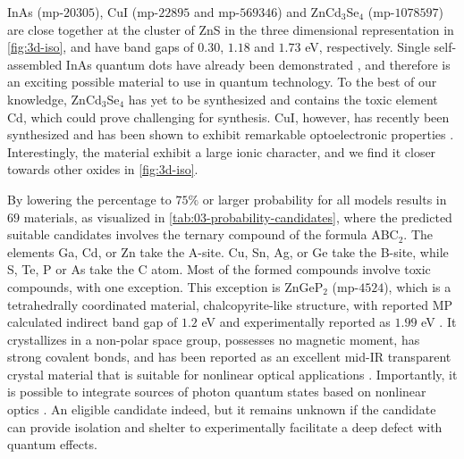 
InAs (mp-$20305$), CuI (mp-$22895$ and mp-$569346$) and ZnCd$_3$Se$_4$ (mp-$1078597$) are close together at the cluster of ZnS in the three dimensional representation in \autoref{fig:3d-iso}, and have band gaps of $0.30$, $1.18$ and $1.73$ eV, respectively. Single self-assembled InAs quantum dots have already been demonstrated \cite{Liu2018}, and therefore is an exciting possible material to use in quantum technology. To the best of our knowledge, ZnCd$_3$Se$_4$ has yet to be synthesized and contains the toxic element Cd, which could prove challenging for synthesis. CuI, however, has recently been synthesized and has been shown to exhibit remarkable optoelectronic properties \cite{Ahn2020}. Interestingly, the material exhibit a large ionic character, and we find it closer towards other oxides in \autoref{fig:3d-iso}.

By lowering the percentage to $75\%$ or larger probability for all models results in $69$ materials, as visualized in \autoref{tab:03-probability-candidates}, where the predicted suitable candidates involves the ternary compound of the formula ABC$_2$. The elements Ga, Cd, or Zn take the A-site. Cu, Sn, Ag, or Ge take the B-site, while S, Te, P or As take the C atom. Most of the formed compounds involve toxic compounds, with one exception. This exception is ZnGeP$_2$ (mp-$4524$), which is a tetrahedrally coordinated material, chalcopyrite-like structure, with reported MP calculated indirect band gap of $1.2$ eV \cite{Zhang2015} and experimentally reported as $1.99$ eV \cite{Xing1989}.
It crystallizes in a non-polar space group, possesses no magnetic moment, has strong covalent bonds, and has been reported as an excellent mid-IR transparent crystal material that is suitable for nonlinear optical applications \cite{Zhang2015}. Importantly, it is possible to integrate sources of photon quantum states based on nonlinear optics \cite{Caspani2017}. An eligible candidate indeed, but it remains unknown if the candidate can provide isolation and shelter to experimentally facilitate a deep defect with quantum effects.




